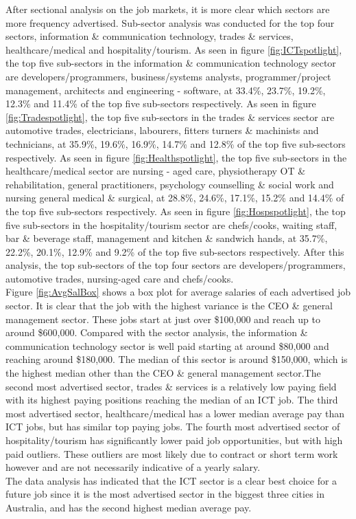 \documentclass[twoside, 12pt, a4paper]{article}
\begin{document}
After sectional analysis on the job markets, it is more clear which sectors are more frequency advertised. Sub-sector analysis was conducted for the top four sectors, information \& communication technology, trades \& services, healthcare/medical and hospitality/tourism. As seen in figure \ref{fig:ICTspotlight}, the top five sub-sectors in the information \& communication technology sector are developers/programmers, business/systems analysts, programmer/project management, architects and engineering - software, at 33.4\%, 23.7\%, 19.2\%, 12.3\% and 11.4\% of the top five sub-sectors respectively. As seen in figure \ref{fig:Tradespotlight}, the top five sub-sectors in the trades \& services sector are automotive trades, electricians, labourers, fitters turners \& machinists and technicians, at 35.9\%, 19.6\%, 16.9\%, 14.7\% and 12.8\% of the top five sub-sectors respectively. As seen in figure \ref{fig:Healthspotlight}, the top five sub-sectors in the healthcare/medical sector are nursing - aged care, physiotherapy OT \& rehabilitation, general practitioners, psychology counselling \& social work and nursing general medical \& surgical, at 28.8\%, 24.6\%, 17.1\%, 15.2\% and 14.4\% of the top five sub-sectors respectively. As seen in figure \ref{fig:Hospspotlight}, the top five sub-sectors in the hospitality/tourism sector are chefs/cooks, waiting staff, bar \& beverage staff, management and kitchen \& sandwich hands, at 35.7\%, 22.2\%, 20.1\%, 12.9\% and 9.2\% of the top five sub-sectors respectively. After this analysis, the top sub-sectors of the top four sectors are developers/programmers, automotive trades, nursing-aged care and chefs/cooks.\\
Figure \ref{fig:AvgSalBox} shows a box plot for average salaries of each advertised job sector. It is clear that the job with the highest variance is the CEO \& general management sector. These jobs start at just over \$100,000 and reach up to around \$600,000. Compared with the sector analysis, the information \& communication technology sector is well paid starting at around \$80,000 and reaching around \$180,000. The median of this sector is around \$150,000, which is the highest median other than the CEO \& general management sector.The second most advertised sector, trades \& services is a relatively low paying field with its highest paying positions reaching the median of an ICT job. The third most advertised sector, healthcare/medical has a lower median average pay than ICT jobs, but has similar top paying jobs. The fourth most advertised sector of hospitality/tourism has significantly lower paid job opportunities, but with high paid outliers. These outliers are most likely due to contract or short term work however and are not necessarily indicative of a yearly salary.\\
The data analysis has indicated that the ICT sector is a clear best choice for a future job since it is the most advertised sector in the biggest three cities in Australia, and has the second highest median average pay. 
\end{document}
